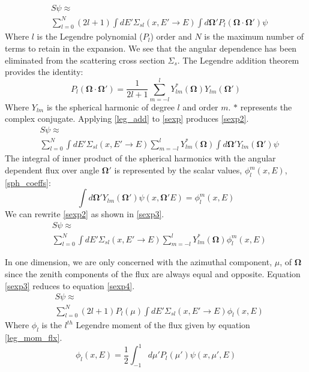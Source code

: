 \begin{eqnarray}
& S\psi \approx \nonumber \\
& \sum_{l=0}^N (2l+1) \int dE' \Sigma_{sl}(x, E'\rightarrow E)
  \int d\mathbf\Omega' P_l(\mathbf\Omega \cdot \mathbf{\Omega'}) \psi
\label{sexp}
\end{eqnarray}
Where $l$ is the Legendre polynomial ($P_l$) order and $N$ is the maximum number of terms to retain in the expansion.  We see that the angular dependence has been eliminated from the scattering cross section $\Sigma_s$.
The Legendre addition theorem provides the identity:
\begin{equation}
P_l(\mathbf\Omega \cdot \mathbf{\Omega'}) = \frac{1}{2l+1}
\sum_{m=-l}^{l} Y^{*}_{lm}(\mathbf\Omega) Y_{lm}(\mathbf\Omega')
\label{leg_add}
\end{equation}
Where $Y_{lm}$ is the spherical harmonic of degree $l$ and order $m$.  $*$ represents the complex conjugate.  Applying \ref{leg_add} to \ref{sexp} produces \ref{sexp2}.
\begin{eqnarray}
& S\psi \approx \nonumber \\
& \sum_{l=0}^N \int dE' \Sigma_{sl}(x, E'\rightarrow E) \sum_{m=-l}^{l} Y^{*}_{lm}(\mathbf\Omega)
  \int d\mathbf\Omega' Y_{lm}(\mathbf\Omega') \psi
\label{sexp2}
\end{eqnarray}
The integral of inner product of the spherical harmonics with the angular dependent flux over angle $\mathbf\Omega'$ is represented by the scalar values, $\phi_l^m(x, E)$, \ref{sph_coeffs}:
\begin{equation}
\int d\mathbf\Omega' Y_{lm}(\mathbf\Omega') \psi(x, \mathbf\Omega' E) = \phi_l^m(x, E)
\label{sph_coeffs}
\end{equation}
We can rewrite \ref{sexp2} as shown in \ref{sexp3}.
\begin{eqnarray}
& S\psi \approx \nonumber \\
& \sum_{l=0}^N \int dE' \Sigma_{sl}(x, E'\rightarrow E) \sum_{m=-l}^{l} Y^{*}_{lm}(\mathbf\Omega) \phi_l^m(x, E)
\label{sexp3}
\end{eqnarray}

In one dimension, we are only concerned with the azimuthal component, $\mu$, of $\mathbf\Omega$ since the zenith components of the flux are always equal and opposite.  Equation \ref{sexp3} reduces to equation \ref{sexp4}.
\begin{eqnarray}
& S\psi \approx \nonumber \\
& \sum_{l=0}^N (2l+1) P_l(\mu) \int dE' \Sigma_{sl}(x, E'\rightarrow E) \phi_l(x, E)
\label{sexp4}
\end{eqnarray}
Where $\phi_l$ is the $l^{th}$ Legendre moment of the flux given by equation \ref{leg_mom_flx}.
\begin{equation}
\phi_l(x,E) = \frac{1}{2} \int_{-1}^1 d\mu' P_l(\mu') \psi(x, \mu', E)
\label{leg_mom_flx}
\end{equation}

